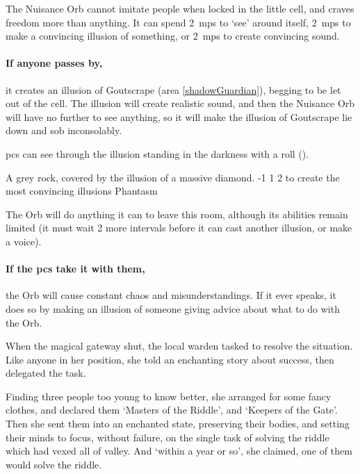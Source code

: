 \begin{multicols}{2}
The Nuisance Orb cannot imitate people when locked in the little cell, and craves freedom more than anything.
It can spend 2~\glspl{mp} to `see' around itself, 2~\glspl{mp} to make a convincing illusion of something, or 2~\glspl{mp} to create convincing sound.

\paragraph{If anyone passes by,}
it creates an illusion of Goutscrape (area \vref{shadowGuardian}), begging to be let out of the cell.
The illusion will create realistic sound, and then the Nuisance Orb will have no further  to see anything, so it will make the illusion of Goutscrape lie down and sob inconsolably.

\Glspl{pc} can see through the illusion standing in the darkness with a  roll
(\tn[12]).

  {A grey rock, covered by the illusion of a massive diamond.}%
  {-1}%
  {1}%
  {2}%
  {to create the most convincing illusions}%
  {Phantasm}%
  {
    \setcounter{Fire}{2}
    \setcounter{Earth}{2}
    \setcounter{Air}{2}
    \setcounter{Academics}{2}
    \setcounter{Survival}{1}
  }%

\showStdSpells[
  \setcounter{diceNo}{0}
]

The Orb will do anything it can to leave this room, although its abilities remain limited (it must wait 2 more \glspl{interval} before it can cast another illusion, or make a voice).

\paragraph{If the \glspl{pc} take it with them,}
the Orb will cause constant chaos and misunderstandings.
If it ever speaks, it does so by making an illusion of someone giving advice about what to do with the Orb.


\begin{exampletext}
  When the magical gateway shut, the local \gls{warden} tasked  to resolve the situation.
  Like anyone in her position, she told an enchanting story about success, then delegated the task.

  Finding three people too young to know better, she arranged for some fancy clothes, and declared them `Masters of the Riddle', and `Keepers of the Gate'.
  Then she sent them into an enchanted state, preserving their bodies, and setting their minds to focus, without failure, on the single task of solving the riddle which had vexed all of \gls{valley}.
  And `within a year or so', she claimed, one of them would solve the riddle.


\end{exampletext}
\end{multicols}
